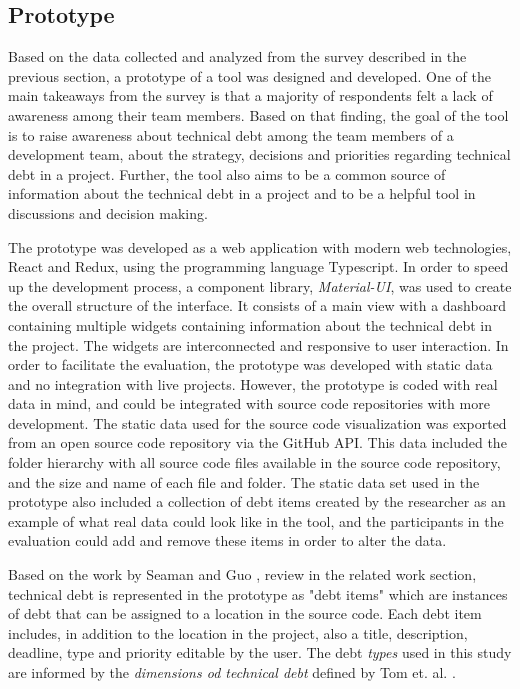 \subsection{Prototype}
Based on the data collected and analyzed from the survey described in the previous section, a prototype of a tool was designed and developed.
One of the main takeaways from the survey is that a majority of respondents felt a lack of awareness among their team members.
Based on that finding, the goal of the tool is to raise awareness about technical debt among the team members of a development team, about the strategy, decisions and priorities regarding technical debt in a project.
Further, the tool also aims to be a common source of information about the technical debt in a project and to be a helpful tool in discussions and decision making.

The prototype was developed as a web application with modern web technologies, React and Redux, using the programming language Typescript.
In order to speed up the development process, a component library, \textit{Material-UI}, was used to create the overall structure of the interface.
It consists of a main view with a dashboard containing multiple widgets containing information about the technical debt in the project.
The widgets are interconnected and responsive to user interaction.
In order to facilitate the evaluation, the prototype was developed with static data and no integration with live projects.
However, the prototype is coded with real data in mind, and could be integrated with source code repositories with more development.
The static data used for the source code visualization was exported from an open source code repository via the GitHub API.
This data included the folder hierarchy with all source code files available in the source code repository, and the size and name of each file and folder.
The static data set used in the prototype also included a collection of debt items created by the researcher as an example of what real data could look like in the tool, and the participants in the evaluation could add and remove these items in order to alter the data.




Based on the work by Seaman and Guo \cite{seaman_measuring_2011}, review in the related work section, technical debt is represented in the prototype as "debt items" which are instances of debt that can be assigned to a location in the source code.
Each debt item includes, in addition to the location in the project, also a title, description, deadline, type and priority editable by the user.
The debt \textit{types} used in this study are informed by the \textit{dimensions od technical debt} defined by Tom et. al. \cite{tom_exploration_2013}.

